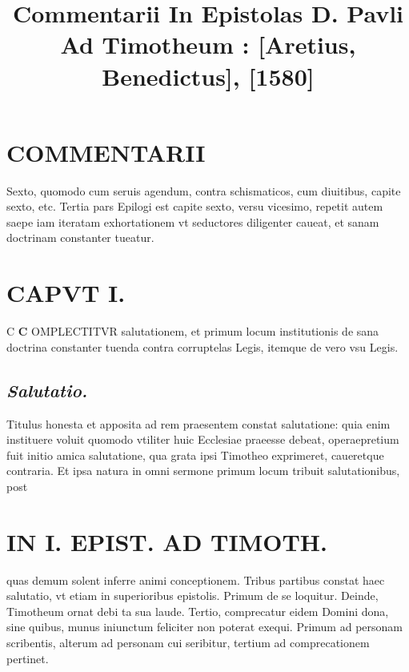 \documentclass{article}
\begin{document}
\date{}
        \title{Commentarii In Epistolas D. Pavli Ad Timotheum : [Aretius, Benedictus], [1580]}
\maketitle
\tableofcontents
\clearpage
\begin{pages} 
\beginnumbering
        
\section*{COMMENTARII }
\marginpar{[ p.8 ]}\pstart Sexto, quomodo cum seruis agendum, contra schismaticos, cum diuitibus, capite sexto, etc.  \pend\pstart Tertia pars Epilogi est capite sexto, versu vicesimo, repetit autem saepe iam iteratam exhortationem vt seductores diligenter caueat, et sanam doctrinam constanter tueatur.  \pend
\endnumbering\beginnumbering\section{CAPVT I.}C \pstart \textbf{C} OMPLECTITVR salutationem, et primum locum institutionis de sana doctrina constanter tuenda contra corruptelas Legis, itemque de vero vsu Legis.  \pend
{}
{}
\subsection*{\textit{Salutatio. }}\pstart Titulus honesta et apposita ad rem praesentem constat salutatione: quia enim instituere voluit quomodo vtiliter huic Ecclesiae praeesse debeat, operaepretium fuit initio amica salutatione, qua grata ipsi Timotheo exprimeret, caueretque contraria. Et ipsa natura in omni sermone primum locum tribuit salutationibus, post  \pend
\section*{IN I. EPIST. AD TIMOTH. }
\marginpar{[ p.9 ]}\pstart quas demum solent inferre animi conceptionem.  \pend\pstart Tribus partibus constat haec salutatio, vt etiam in superioribus epistolis. Primum de se loquitur. Deinde, Timotheum ornat debi ta sua laude. Tertio, comprecatur eidem Domini dona, sine quibus, munus iniunctum feliciter non poterat exequi. Primum ad personam scribentis, alterum ad personam cui seribitur, tertium ad comprecationem pertinet.  \pend
{}
{}

\end{pages}
\end{document}
